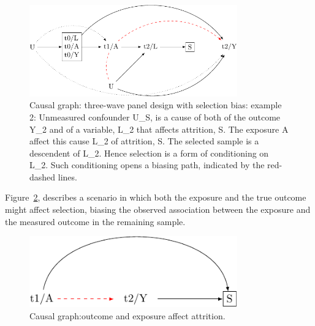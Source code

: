 \documentclass[
  singlecolumn]{report}
\begin{document}
\begin{figure}

{\centering \includegraphics[width=0.8\textwidth,height=\textheight]{causal-dags_files/figure-pdf/fig-dag-8-2-1.pdf}

}

\caption{\label{fig-dag-8-2}Causal graph: three-wave panel design with
selection bias: example 2: Unmeasured confounder U\_S, is a cause of
both of the outcome Y\_2 and of a variable, L\_2 that affects attrition,
S. The exposure A affect this cause L\_2 of attrition, S. The selected
sample is a descendent of L\_2. Hence selection is a form of
conditioning on L\_2. Such conditioning opens a biasing path, indicated
by the red-dashed lines.}

\end{figure}

Figure~\ref{fig-dag-8-5}, describes a scenario in which both the
exposure and the true outcome might affect selection, biasing the
observed association between the exposure and the measured outcome in
the remaining sample.

\begin{figure}

{\centering \includegraphics[width=0.8\textwidth,height=\textheight]{causal-dags_files/figure-pdf/fig-dag-8-5-1.pdf}

}

\caption{\label{fig-dag-8-5}Causal graph:outcome and exposure affect
attrition.}

\end{figure}
\end{document}
